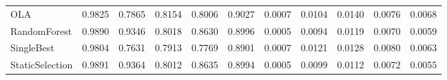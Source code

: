 \begin{table}[h!]
\begin{tabular}{l|l|l|l|l|l|l|l|l|l|l}
                        OLA &    0.9825 &     0.7865 &  0.8154 &    0.8006 &   0.9027 &        0.0007 &         0.0104 &      0.0140 &        0.0076 &       0.0068 \\
               RandomForest &    0.9890 &     0.9346 &  0.8018 &    0.8630 &   0.8996 &        0.0005 &         0.0094 &      0.0119 &        0.0070 &       0.0059 \\
                 SingleBest &    0.9804 &     0.7631 &  0.7913 &    0.7769 &   0.8901 &        0.0007 &         0.0121 &      0.0128 &        0.0080 &       0.0063 \\
            StaticSelection &    0.9891 &     0.9364 &  0.8012 &    0.8635 &   0.8994 &        0.0005 &         0.0099 &      0.0112 &        0.0072 &       0.0055 \\
\bottomrule
\end{tabular}

\end{table}
